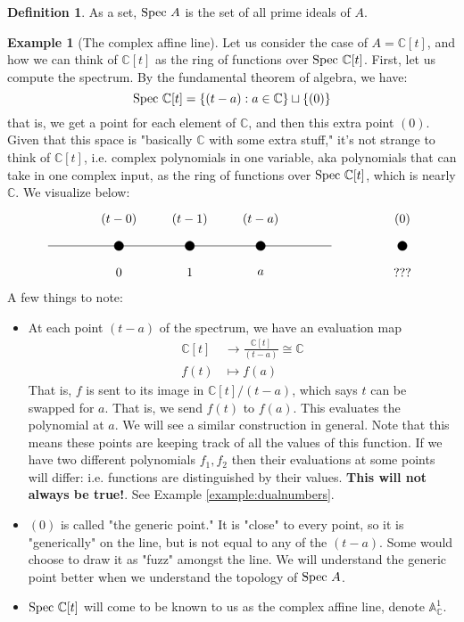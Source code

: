 \documentclass[10pt,reqno]{amsart}
\theoremstyle{definition}
\newtheorem{example}[theorem]{Example}
\newtheorem{definition}[theorem]{Definition}
\theoremstyle{remark}
\numberwithin{equation}{section}
\numberwithin{theorem}{section}
\newcommand{\C}{{\mathbb C}}
\newcommand{\spec}{\textup{Spec }}
\newcommand{\A}{{\mathbb A}}
\begin{document}
\begin{definition} As a set, $\spec A$ is the set of all prime ideals of $A$.
\end{definition}

\begin{example}[The complex affine line] Let us consider the case of $A = \C[t]$, and how we can think of $\C[t]$ as the ring of functions over $\spec \C[t]$. First, let us compute the spectrum. By the fundamental theorem of algebra, we have:
\[\spec \C[t] = \{(t-a): a \in \C\} \sqcup \{(0)\}\]
that is, we get a point for each element of $\C$, and then this extra point $(0)$. Given that this space is "basically $\C$ with some extra stuff," it's not strange to think of $\C[t]$, i.e. complex polynomials in one variable, aka polynomials that can take in one complex input, as the ring of functions over $\spec \C[t]$, which is nearly $\C$. We visualize below:
\[\begin{tikzpicture}[scale=1]
  \draw (0,0)--(8,0);
  \filldraw (2,0) circle (.13);
  \filldraw (4,0) circle (.13);
  \filldraw (6,0) circle (.13);
  \filldraw (10,0) circle (.13);

  \node at (2,.75) {$(t-0)$};
  \node at (4,.75) {$(t-1)$};
  \node at (6,.75) {$(t-a)$};
  \node at (10,.75) {$(0)$};
  
  \node at (2,-.75) {$0$};
  \node at (4,-.75) {$1$};
  \node at (6,-.75) {$a$};
  \node at (10,-.75) {???};
\end{tikzpicture}\]
A few things to note:
\begin{itemize}
\item At each point $(t-a)$ of the spectrum, we have an evaluation map
\begin{align*}
\C[t] &\to \frac{\C[t]}{(t-a)} \cong \C\\
f(t) &\mapsto f(a)
\end{align*}
That is, $f$ is sent to its image in $\C[t]/(t-a)$, which says $t$ can be swapped for $a$. That is, we send $f(t)$ to $f(a)$. This evaluates the polynomial at $a$. We will see a similar construction in general. Note that this means these points are keeping track of all the values of this function. If we have two different polynomials $f_1,f_2$ then their evaluations at some points will differ: i.e. functions are distinguished by their values. \textbf{This will not always be true!}. See Example \ref{example:dualnumbers}.

\item $(0)$ is called "the generic point." It is "close" to every point, so it is "generically" on the line, but is not equal to any of the $(t-a)$. Some would choose to draw it as "fuzz" amongst the line. We will understand the generic point better when we understand the topology of $\spec A$. 
\item $\spec \C[t]$ will come to be known to us as the complex affine line, denote $\A^1_{\C}$.
\end{itemize}
\end{example}
\end{document}
